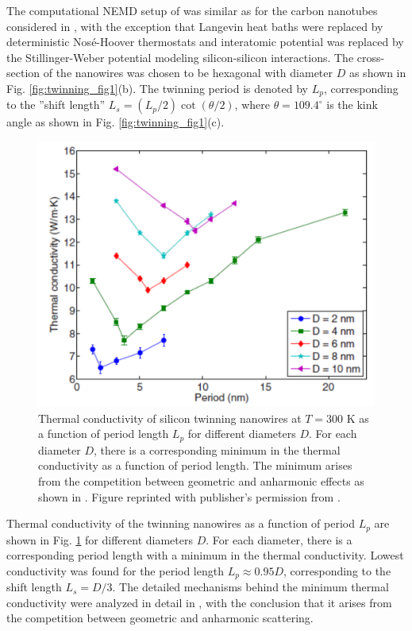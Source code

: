 The computational NEMD setup of  was similar as for the carbon nanotubes considered in , with the exception that Langevin heat baths were replaced by deterministic Nos\'e-Hoover thermostats \cite{nose84} and interatomic potential was replaced by the Stillinger-Weber potential \cite{stillinger85} modeling silicon-silicon interactions. The cross-section of the nanowires was chosen to be hexagonal with diameter $D$ as shown in Fig. \ref{fig:twinning_fig1}(b). The twinning period is denoted by $L_p$, corresponding to the ''shift length'' $L_s=(L_p/2)\cot(\theta/2)$, where $\theta=109.4^{\circ}$ is the kink angle as shown in Fig. \ref{fig:twinning_fig1}(c). 


\begin{figure}[tb]
 \begin{center}
   \includegraphics[width=.89\columnwidth]{pics/twinning_fig2a_mod.pdf} 
  \caption{Thermal conductivity of silicon twinning nanowires at $T=300$ K as a function of period length $L_p$ for different diameters $D$. For each diameter $D$, there is a corresponding minimum in the thermal conductivity as a function of period length. The minimum arises from the competition between geometric and anharmonic effects as shown in . Figure reprinted with publisher's permission from .}  
\label{fig:twinning_fig2}
 \end{center}
\end{figure}

Thermal conductivity of the twinning nanowires as a function of period $L_p$ are shown in Fig. \ref{fig:twinning_fig2} for different diameters $D$. For each diameter, there is a corresponding period length with a minimum in the thermal conductivity. Lowest conductivity was found for the period length $L_p\approx 0.95D$, corresponding to the shift length $L_s=D/3$. The detailed mechanisms behind the minimum thermal conductivity were analyzed in detail in , with the conclusion that it arises from the competition between geometric and anharmonic scattering.  

